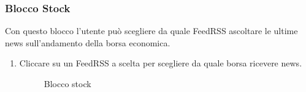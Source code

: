 \subsubsection{Blocco Stock}
Con questo blocco l'utente può scegliere da quale FeedRSS ascoltare le ultime news sull'andamento della borsa economica.
\begin{enumerate}
	\item Cliccare su un FeedRSS a scelta per scegliere da quale borsa ricevere news.
	\begin{figure}[!ht]
		\centering
		\caption{Blocco stock}
	\end{figure}
\end{enumerate}
\newpage
